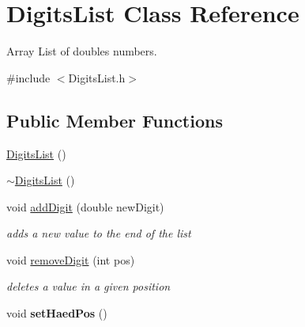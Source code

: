 \hypertarget{class_digits_list}{}\section{Digits\+List Class Reference}
\label{class_digits_list}


Array List of doubles numbers.  




{\ttfamily \#include $<$Digits\+List.\+h$>$}

\subsection*{Public Member Functions}
\begin{DoxyCompactItemize}
\item 
\hyperlink{class_digits_list_ad411aabde5a6b36b9380375993f47787}{Digits\+List} ()
\item 
\hyperlink{class_digits_list_a98892f758d6b9ad2aa3e7dac2b476655}{$\sim$\+Digits\+List} ()
\item 
void \hyperlink{class_digits_list_a09507db08df6c7c6013965e14f89e035}{add\+Digit} (double new\+Digit)
\begin{DoxyCompactList}\small\item\em adds a new value to the end of the list \end{DoxyCompactList}\item 
void \hyperlink{class_digits_list_a28fd1ee834c98ed64dbcafe18f710e9d}{remove\+Digit} (int pos)
\begin{DoxyCompactList}\small\item\em deletes a value in a given position \end{DoxyCompactList}\item 
\hypertarget{class_digits_list_ae53ff58f37f8bf8fde9ef53ab2c6c502}{}void {\bfseries set\+Haed\+Pos} ()\label{class_digits_list_ae53ff58f37f8bf8fde9ef53ab2c6c502}


\end{DoxyCompactItemize}
